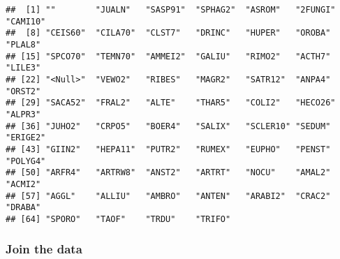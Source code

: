 \documentclass[
]{book}
\newenvironment{Shaded}{\begin{snugshade}}{\end{snugshade}}
\newcommand{\CommentTok}[1]{\textcolor[rgb]{0.56,0.35,0.01}{\textit{#1}}}
\newcommand{\DataTypeTok}[1]{\textcolor[rgb]{0.13,0.29,0.53}{#1}}
\newcommand{\KeywordTok}[1]{\textcolor[rgb]{0.13,0.29,0.53}{\textbf{#1}}}
\newcommand{\NormalTok}[1]{#1}
\newcommand{\OperatorTok}[1]{\textcolor[rgb]{0.81,0.36,0.00}{\textbf{#1}}}
\newcommand{\StringTok}[1]{\textcolor[rgb]{0.31,0.60,0.02}{#1}}
\begin{document}
\begin{Shaded}
\end{Shaded}

\begin{verbatim}
##  [1] ""        "JUALN"   "SASP91"  "SPHAG2"  "ASROM"   "2FUNGI"  "CAMI10" 
##  [8] "CEIS60"  "CILA70"  "CLST7"   "DRINC"   "HUPER"   "OROBA"   "PLAL8"  
## [15] "SPCO70"  "TEMN70"  "AMMEI2"  "GALIU"   "RIMO2"   "ACTH7"   "LILE3"  
## [22] "<Null>"  "VEWO2"   "RIBES"   "MAGR2"   "SATR12"  "ANPA4"   "ORST2"  
## [29] "SACA52"  "FRAL2"   "ALTE"    "THAR5"   "COLI2"   "HECO26"  "ALPR3"  
## [36] "JUHO2"   "CRPO5"   "BOER4"   "SALIX"   "SCLER10" "SEDUM"   "ERIGE2" 
## [43] "GIIN2"   "HEPA11"  "PUTR2"   "RUMEX"   "EUPHO"   "PENST"   "POLYG4" 
## [50] "ARFR4"   "ARTRW8"  "ANST2"   "ARTRT"   "NOCU"    "AMAL2"   "ACMI2"  
## [57] "AGGL"    "ALLIU"   "AMBRO"   "ANTEN"   "ARABI2"  "CRAC2"   "DRABA"  
## [64] "SPORO"   "TAOF"    "TRDU"    "TRIFO"
\end{verbatim}

\hypertarget{join-the-data}{%
\subsubsection{Join the data}\label{join-the-data}}
\end{document}
